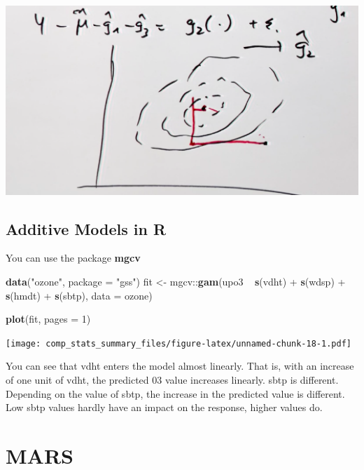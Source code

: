 \documentclass[]{book}
\newenvironment{Shaded}{\begin{snugshade}}{\end{snugshade}}
\newcommand{\KeywordTok}[1]{\textcolor[rgb]{0.13,0.29,0.53}{\textbf{{#1}}}}
\newcommand{\DataTypeTok}[1]{\textcolor[rgb]{0.13,0.29,0.53}{{#1}}}
\newcommand{\DecValTok}[1]{\textcolor[rgb]{0.00,0.00,0.81}{{#1}}}
\newcommand{\StringTok}[1]{\textcolor[rgb]{0.31,0.60,0.02}{{#1}}}
\newcommand{\NormalTok}[1]{{#1}}
\begin{document}
\includegraphics[width=6.78in]{figures/coordinate_wise}

\subsection{Additive Models in R}\label{additive-models-in-r}

You can use the package \textbf{mgcv}

\begin{Shaded}
\begin{Highlighting}[]
\KeywordTok{data}\NormalTok{(}\StringTok{"ozone"}\NormalTok{, }\DataTypeTok{package =} \StringTok{"gss"}\NormalTok{) }
\NormalTok{fit <-}\StringTok{ }\NormalTok{mgcv::}\KeywordTok{gam}\NormalTok{(upo3 ~}\StringTok{ }\KeywordTok{s}\NormalTok{(vdht) +}\StringTok{ }\KeywordTok{s}\NormalTok{(wdsp) +}\StringTok{ }\KeywordTok{s}\NormalTok{(hmdt) +}\StringTok{ }\KeywordTok{s}\NormalTok{(sbtp), }
           \DataTypeTok{data =} \NormalTok{ozone) }

\KeywordTok{plot}\NormalTok{(fit, }\DataTypeTok{pages =} \DecValTok{1}\NormalTok{) }
\end{Highlighting}
\end{Shaded}

\texttt{[image: comp\_stats\_summary\_files/figure-latex/unnamed-chunk-18-1.pdf]}

You can see that vdht enters the model almost linearly. That is, with an
increase of one unit of vdht, the predicted 03 value increases linearly.
sbtp is different. Depending on the value of sbtp, the increase in the
predicted value is different. Low sbtp values hardly have an impact on
the response, higher values do.

\section{MARS}\label{mars}
\end{document}
